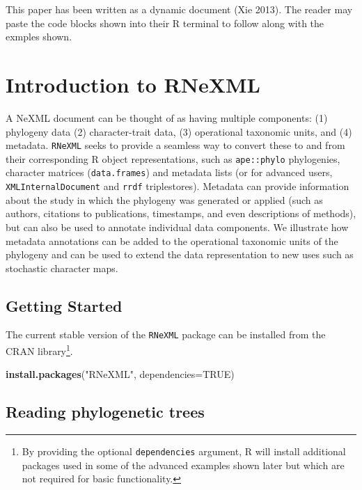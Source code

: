 \documentclass[author-year, review, 11pt]{components/elsarticle} %
\newenvironment{Shaded}{\begin{snugshade}}{\end{snugshade}}
\newcommand{\KeywordTok}[1]{\textcolor[rgb]{0.13,0.29,0.53}{\textbf{{#1}}}}
\newcommand{\DataTypeTok}[1]{\textcolor[rgb]{0.13,0.29,0.53}{{#1}}}
\newcommand{\StringTok}[1]{\textcolor[rgb]{0.31,0.60,0.02}{{#1}}}
\newcommand{\OtherTok}[1]{\textcolor[rgb]{0.56,0.35,0.01}{{#1}}}
\newcommand{\NormalTok}[1]{{#1}}
\begin{document}
This paper has been written as a dynamic document (Xie 2013). The reader
may paste the code blocks shown into their R terminal to follow along
with the exmples shown.

\section{Introduction to RNeXML}\label{introduction-to-rnexml}

A NeXML document can be thought of as having multiple components: (1)
phylogeny data (2) character-trait data, (3) operational taxonomic
units, and (4) metadata. \texttt{RNeXML} seeks to provide a seamless way
to convert these to and from their corresponding R object
representations, such as \texttt{ape::phylo} phylogenies, character
matrices (\texttt{data.frames}) and metadata lists (or for advanced
users, \texttt{XMLInternalDocument} and \texttt{rrdf} triplestores).
Metadata can provide information about the study in which the phylogeny
was generated or applied (such as authors, citations to publications,
timestamps, and even descriptions of methods), but can also be used to
annotate individual data components. We illustrate how metadata
annotations can be added to the operational taxonomic units of the
phylogeny and can be used to extend the data representation to new uses
such as stochastic character maps.

\subsection{Getting Started}\label{getting-started}

The current stable version of the \texttt{RNeXML} package can be
installed from the CRAN library\footnote{By providing the optional
  \texttt{dependencies} argument, R will install additional packages
  used in some of the advanced examples shown later but which are not
  required for basic functionality.}.

\begin{Shaded}
\begin{Highlighting}[]
\KeywordTok{install.packages}\NormalTok{(}\StringTok{"RNeXML"}\NormalTok{, }\DataTypeTok{dependencies=}\OtherTok{TRUE}\NormalTok{)}
\end{Highlighting}
\end{Shaded}

\subsection{Reading phylogenetic
trees}\label{reading-phylogenetic-trees}
\end{document}
